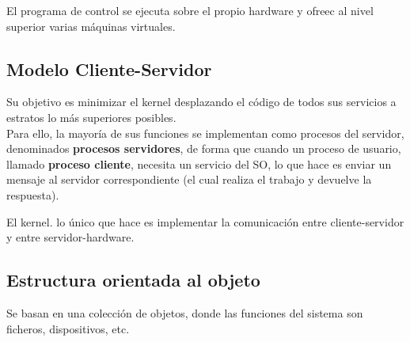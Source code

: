 \documentclass[spanish, 12pt]{article}
\begin{document}
			El programa de control se ejecuta sobre el propio hardware y ofreec al nivel superior varias máquinas virtuales.
			
			\centerline{}
			\centerline{}
			\centerline{}
			
		\subsection{Modelo Cliente-Servidor}
		
			Su objetivo es minimizar el kernel desplazando el código de todos sus servicios a estratos lo más superiores posibles.\\
			
			Para ello, la mayoría de sus funciones se implementan como procesos del servidor, denominados \textbf{procesos servidores}, de forma que cuando un proceso de usuario, llamado \textbf{proceso cliente}, necesita un servicio del SO, lo que hace es enviar un mensaje al servidor correspondiente (el cual realiza el trabajo y devuelve la respuesta).\\
			
			\begin{figure}[H]
				\centerline{}
			\end{figure}
			
			El kernel. lo único que hace es implementar la comunicación entre cliente-servidor y entre servidor-hardware.\\
			
			\newpage
			
		\subsection{Estructura orientada al objeto}
	
			Se basan en una colección de objetos, donde las funciones del sistema son ficheros, dispositivos, etc.\\
			
\end{document}
